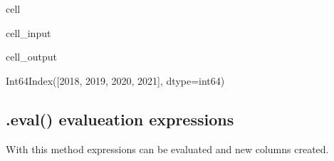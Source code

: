 \documentclass[letterpaper,10pt,english]{jupyterBook}
\begin{document}
\begin{sphinxuseclass}{cell}\begin{sphinxVerbatimInput}

\begin{sphinxuseclass}{cell_input}
\begin{sphinxVerbatim}[commandchars=\\\{\}]
\end{sphinxVerbatim}

\end{sphinxuseclass}\end{sphinxVerbatimInput}
\begin{sphinxVerbatimOutput}

\begin{sphinxuseclass}{cell_output}
\begin{sphinxVerbatim}[commandchars=\\\{\}]
Int64Index([2018, 2019, 2020, 2021], dtype=\PYGZsq{}int64\PYGZsq{})
\end{sphinxVerbatim}

\end{sphinxuseclass}\end{sphinxVerbatimOutput}

\end{sphinxuseclass}

\subsection{.eval() evalueation expressions}
\label{\detokenize{content/notebooks/pandas/dataframes:eval-evalueation-expressions}}
\sphinxAtStartPar
With this method expressions can be evaluated and new columns created.
\end{document}
